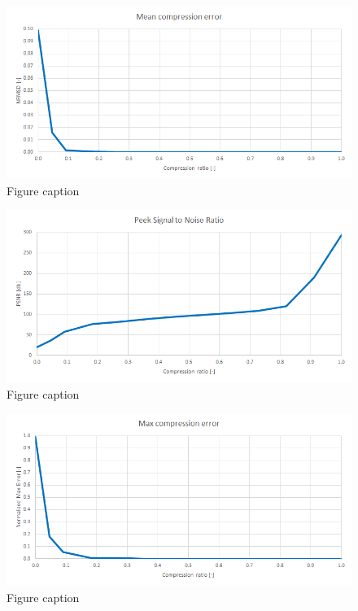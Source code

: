 \begin{figure}[ht]
\centering\includegraphics[width=\textwidth]{figures/chotkova_NRMSD}
\caption{Figure caption}
\end{figure}

\begin{figure}[ht]
\centering\includegraphics[width=\textwidth]{figures/chotkova_PSNR}
\caption{Figure caption}
\end{figure}

\begin{figure}[ht]
\centering\includegraphics[width=\textwidth]{figures/chotkova_MaxError}
\caption{Figure caption}
\end{figure}

